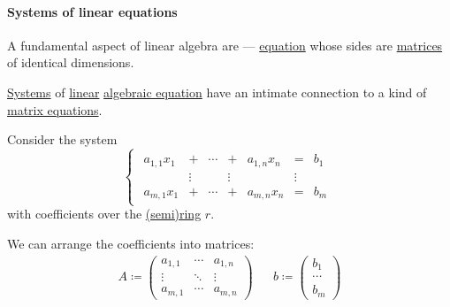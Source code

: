 \paragraph{Systems of linear equations}

\begin{definition}\label{def:matrix_equation}\mimprovised
  A fundamental aspect of linear algebra are  --- \hyperref[def:equation]{equation} whose sides are \hyperref[def:array/matrix]{matrices} of identical dimensions.
\end{definition}

\begin{definition}\label{def:system_of_linear_equations}\mimprovised
  \hyperref[def:system_of_equations]{Systems} of \hyperref[tab:def:polynomial_degree]{linear} \hyperref[def:polynomial_equation]{algebraic equation} have an intimate connection to a kind of \hyperref[def:matrix_equation]{matrix equations}.

  Consider the system
  \begin{equation}\label{eq:def:system_of_linear_equations/scalar_form}
    \begin{cases}
      \begin{array}{ccccccc}
        a_{1,1} x_1 & +      & \cdots & +      & a_{1,n} x_n & =      & b_1 \\
                    & \vdots &        & \vdots &             & \vdots &     \\
        a_{m,1} x_1 & +      & \cdots & +      & a_{m,n} x_n & =      & b_m
      \end{array}
    \end{cases}
  \end{equation}
  with coefficients over the \hyperref[def:semiring]{(semi)ring} \( r \).

  We can arrange the coefficients into matrices:
  \begin{align*}
    A \coloneqq \begin{pmatrix}
      a_{1,1} & \cdots & a_{1,n} \\
      \vdots  & \ddots & \vdots  \\
      a_{m,1} & \cdots & a_{m,n}
    \end{pmatrix}
    &&
    b \coloneqq \begin{pmatrix}
      b_1 \\ \cdots \\ b_m
    \end{pmatrix}
  \end{align*}


\end{definition}
